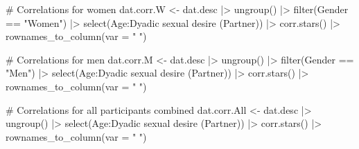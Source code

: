 \documentclass[
  bookmarksnumbered]{article}
\newenvironment{Shaded}{\begin{snugshade}}{\end{snugshade}}
\newcommand{\AttributeTok}[1]{\textcolor[rgb]{0.80,0.80,0.80}{#1}}
\newcommand{\CommentTok}[1]{\textcolor[rgb]{0.50,0.62,0.50}{#1}}
\newcommand{\FunctionTok}[1]{\textcolor[rgb]{0.94,0.94,0.56}{#1}}
\newcommand{\NormalTok}[1]{\textcolor[rgb]{0.80,0.80,0.80}{#1}}
\newcommand{\OtherTok}[1]{\textcolor[rgb]{0.94,0.94,0.56}{#1}}
\newcommand{\SpecialCharTok}[1]{\textcolor[rgb]{0.86,0.64,0.64}{#1}}
\newcommand{\StringTok}[1]{\textcolor[rgb]{0.80,0.58,0.58}{#1}}
\begin{document}
\begin{Shaded}
\begin{Highlighting}[]
\CommentTok{\# Correlations for women}
\NormalTok{dat.corr.W }\OtherTok{\textless{}{-}}\NormalTok{ dat.desc }\SpecialCharTok{|\textgreater{}}
  \FunctionTok{ungroup}\NormalTok{() }\SpecialCharTok{|\textgreater{}}
  \FunctionTok{filter}\NormalTok{(Gender }\SpecialCharTok{==} \StringTok{"Women"}\NormalTok{) }\SpecialCharTok{|\textgreater{}}
  \FunctionTok{select}\NormalTok{(Age}\SpecialCharTok{:}\StringTok{\textasciigrave{}}\AttributeTok{Dyadic sexual desire (Partner)}\StringTok{\textasciigrave{}}\NormalTok{) }\SpecialCharTok{|\textgreater{}}
  \FunctionTok{corr.stars}\NormalTok{() }\SpecialCharTok{|\textgreater{}}
  \FunctionTok{rownames\_to\_column}\NormalTok{(}\AttributeTok{var =} \StringTok{" "}\NormalTok{)}

\CommentTok{\# Correlations for men}
\NormalTok{dat.corr.M }\OtherTok{\textless{}{-}}\NormalTok{ dat.desc }\SpecialCharTok{|\textgreater{}}
  \FunctionTok{ungroup}\NormalTok{() }\SpecialCharTok{|\textgreater{}}
  \FunctionTok{filter}\NormalTok{(Gender }\SpecialCharTok{==} \StringTok{"Men"}\NormalTok{) }\SpecialCharTok{|\textgreater{}}
  \FunctionTok{select}\NormalTok{(Age}\SpecialCharTok{:}\StringTok{\textasciigrave{}}\AttributeTok{Dyadic sexual desire (Partner)}\StringTok{\textasciigrave{}}\NormalTok{) }\SpecialCharTok{|\textgreater{}}
  \FunctionTok{corr.stars}\NormalTok{() }\SpecialCharTok{|\textgreater{}}
  \FunctionTok{rownames\_to\_column}\NormalTok{(}\AttributeTok{var =} \StringTok{" "}\NormalTok{)}

\CommentTok{\# Correlations for all participants combined}
\NormalTok{dat.corr.All }\OtherTok{\textless{}{-}}\NormalTok{ dat.desc }\SpecialCharTok{|\textgreater{}}
  \FunctionTok{ungroup}\NormalTok{() }\SpecialCharTok{|\textgreater{}}
  \FunctionTok{select}\NormalTok{(Age}\SpecialCharTok{:}\StringTok{\textasciigrave{}}\AttributeTok{Dyadic sexual desire (Partner)}\StringTok{\textasciigrave{}}\NormalTok{) }\SpecialCharTok{|\textgreater{}}
  \FunctionTok{corr.stars}\NormalTok{() }\SpecialCharTok{|\textgreater{}}
  \FunctionTok{rownames\_to\_column}\NormalTok{(}\AttributeTok{var =} \StringTok{" "}\NormalTok{)}


\end{Highlighting}
\end{Shaded}
\end{document}

